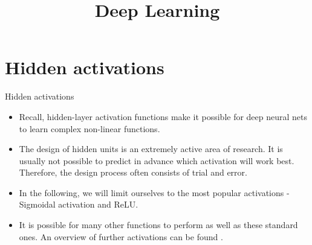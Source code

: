 




\newcommand{\titlefigure}{figure/leakyrelu_deriv.png}
\newcommand{\learninggoals}{
  \item Challenges in Optimization related to Activation Functions
  \item Activations for Hidden Units
  \item Actications for Output Units

}

\title{Deep Learning}
\date{}




\section{Hidden activations}

\begin{frame}{Hidden activations}
  \begin{itemize}
  \item Recall, hidden-layer activation functions make it possible for deep neural nets to learn complex non-linear functions.
  \item The design of hidden units is an extremely active area of research. 
   It is usually not possible to predict in advance which activation will work best. Therefore, the design process often consists of trial and error.
  \item In the following, we will limit ourselves to the most popular activations - Sigmoidal activation and ReLU.
  \item It is possible for many other functions to perform as well as these standard ones. An overview of further activations can be found \href{https://medium.com/@himanshuxd/activation-functions-sigmoid-relu-leaky-relu-and-softmax-basics-for-neural-networks-and-deep-8d9c70eed91e}{}.
  \end{itemize}
\end{frame}

